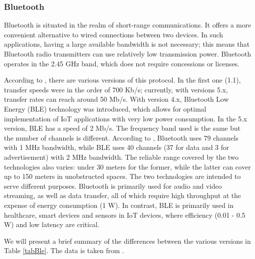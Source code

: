 \documentclass[english]{article}
\newcounter{subsubsubsection}[subsubsection]
\begin{document}
\subsubsection{Bluetooth}
Bluetooth is situated in the realm of short-range communications. It offers a more convenient alternative to wired connections between two devices. In such applications, having a large available bandwidth is not necessary; this means that Bluetooth radio transmitters can use relatively low transmission power. Bluetooth operates in the 2.45 GHz band, which does not require concessions or licenses.

According to \cite{Transmission}, there are various versions of this protocol. In the first one (1.1), transfer speeds were in the order of 700 Kb/s; currently, with versions 5.x, transfer rates can reach around 50 Mb/s. With version 4.x, Bluetooth Low Energy (BLE) technology was introduced, which allows for optimal implementation of IoT applications with very low power consumption. In the 5.x version, BLE has a speed of 2 Mb/s. The frequency band used is the same but the number of channels is different. According to \cite{blee}, Bluetooth uses 79 channels with 1 MHz bandwidth, while BLE uses 40 channels (37 for data and 3 for advertisement) with 2 MHz bandwidth. The reliable range covered by the two technologies also varies: under 30 meters for the former, while the latter can cover up to 150 meters in unobstructed spaces.
The two technologies are intended to serve different purposes. Bluetooth is primarily used for audio and video streaming, as well as data transfer, all of which require high throughput at the expense of energy consumption (1 W). In contrast, BLE is primarily used in healthcare, smart devices and sensors in IoT devices, where efficiency (0.01 - 0.5 W) and low latency are critical.

We will present a brief summary of the differences between the various versions in Table \ref{tabBle}. The data is taken from \cite{G_2023,matlab}.
\end{document}
